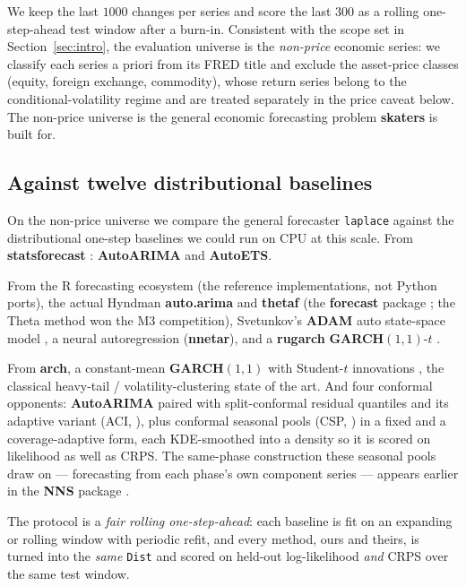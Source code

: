 \documentclass[article]{jss}
\providecommand{\proglang}[1]{\textsf{#1}}
\providecommand{\pkg}[1]{\textbf{#1}}
\providecommand{\code}[1]{\texttt{#1}}
\begin{document}
We keep the last $1000$ changes per series and score the last $300$ as a
rolling one-step-ahead test window after a burn-in. Consistent with the scope set
in Section~\ref{sec:intro}, the evaluation universe is the \emph{non-price}
economic series: we classify each series a priori from its FRED title and exclude
the asset-price classes (equity, foreign exchange, commodity), whose return
series belong to the conditional-volatility regime and are treated separately in
the price caveat below. The non-price universe is the general economic forecasting
problem \pkg{skaters} is built for.

\subsection{Against twelve distributional baselines} \label{sec:sota}

On the non-price universe we compare the general forecaster \code{laplace}
against the distributional one-step baselines we could run on CPU at this
scale. From
\pkg{statsforecast} \citep{garza2022statsforecast}: \pkg{AutoARIMA} and
\pkg{AutoETS}.

From the \proglang{R} forecasting ecosystem (the reference
implementations, not Python ports), the actual Hyndman \pkg{auto.arima} and
\pkg{thetaf} (the \pkg{forecast} package \citep{hyndman2008automatic}; the Theta
method \citep{assimakopoulos2000theta} won the M3 competition), Svetunkov's
\pkg{ADAM} auto state-space model \citep{svetunkov2023adam}, a neural
autoregression (\pkg{nnetar}), and a \pkg{rugarch} \pkg{GARCH}$(1,1)$-$t$
\citep{ghalanos2022rugarch}.

From \pkg{arch}, a constant-mean \pkg{GARCH}$(1,1)$
with Student-$t$ innovations
\citep{bollerslev1986generalized,bollerslev1987conditionally}, the classical
heavy-tail / volatility-clustering state of the art. And four conformal opponents:
\pkg{AutoARIMA} paired with split-conformal residual quantiles
\citep{vovk2019conformal} and its adaptive variant (ACI,
\citealp{gibbs2021adaptive}), plus conformal seasonal pools (CSP,
\citealp{manokhin2026csp}) in a fixed and a coverage-adaptive form, each
KDE-smoothed into a density so it is scored on likelihood as well as CRPS.
The same-phase construction these seasonal pools draw on --- forecasting from
each phase's own component series --- appears earlier in the \pkg{NNS} package
\citep{viole2026nns}.

The protocol is a \emph{fair rolling one-step-ahead}: each baseline is fit on an
expanding or rolling window with periodic refit, and every method, ours and
theirs, is turned into the \emph{same} \code{Dist} and scored on held-out
log-likelihood \emph{and} CRPS over the same test window.
\end{document}
